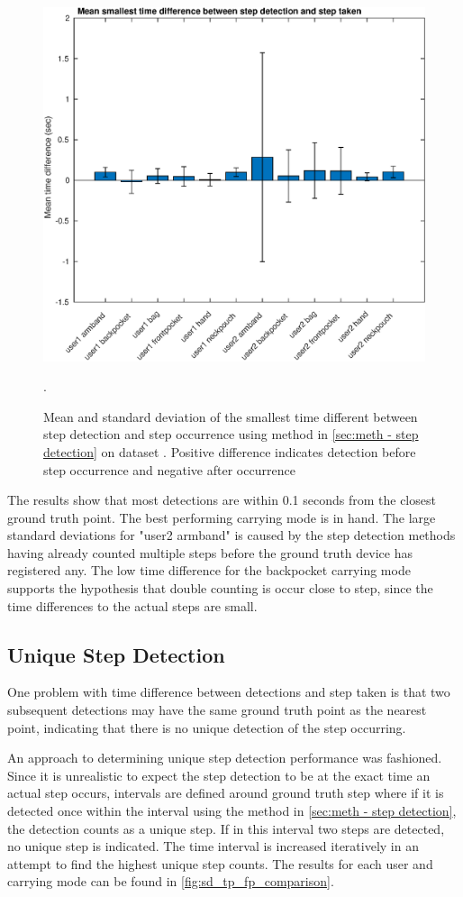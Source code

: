 \begin{figure}[H]
	\centering
	\includegraphics[width=0.7\linewidth]{images/20201127_1607_Mean_smallest_time_difference_between_step_detection_and_step_taken}
	\caption{Mean and standard deviation of the smallest time different between step detection and step occurrence using method in \cref{sec:meth - step detection} on \citet{Brajdic2013} dataset . Positive difference indicates detection before step occurrence and negative after occurrence}
	\label{fig:202011130914smallest_diff_to_gt_1}.
\end{figure}

The results show that most detections are within 0.1 seconds from the closest ground truth point. The best performing carrying mode is in hand. The large standard deviations for "user2 armband" is caused by the step detection methods having already counted multiple steps before the ground truth device has registered any. The low time difference for the backpocket carrying mode supports the hypothesis that double counting is occur close to step, since the time differences to the actual steps are small.

\subsection{Unique Step Detection}

One problem with time difference between detections and step taken is that two subsequent detections may have the same ground truth point as the nearest point, indicating that there is no unique detection of the step occurring. \par 

An approach to determining unique step detection performance was fashioned. Since it is unrealistic to expect the step detection to be at the exact time an actual step occurs, intervals are defined around ground truth step where if it is detected once within the interval using the method in \cref{sec:meth - step detection}, the detection counts as a unique step. If in this interval two steps are detected, no unique step is indicated. The time interval is increased iteratively in an attempt to find the highest unique step counts. The results for each user and carrying mode can be found in \cref{fig:sd_tp_fp_comparison}. 

